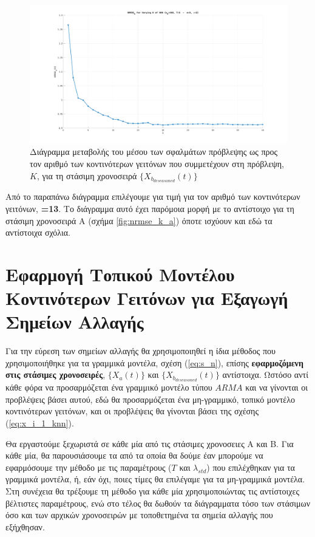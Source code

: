 \begin{figure}[H]
    \begin{center}
        \includegraphics[width=\textwidth]{assets/images/plots/nrmse_k_b.svg.pdf}
        \caption{Διάγραμμα μεταβολής του μέσου  των σφαλμάτων πρόβλεψης ως προς τον αριθμό των κοντινότερων γειτόνων που συμμετέχουν στη πρόβλεψη, $K$, για τη στάσιμη χρονοσειρά $\{X_{b_{deseasoned}}(t)\}$}
        \label{fig:nrmse_k_b}
    \end{center}
\end{figure}

Από το παραπάνω διάγραμμα επιλέγουμε για τιμή για τον αριθμό των κοντινότερων γειτόνων, \textbf{=13}. Το διάγραμμα αυτό έχει παρόμοια μορφή με το αντίστοιχο για τη στάσιμη χρονοσειρά Α (σχήμα \ref{fig:nrmse_k_a}) όποτε ισχύουν και εδώ τα αντίστοιχα σχόλια.


\section{Εφαρμογή Τοπικού Μοντέλου Κοντινότερων Γειτόνων για Εξαγωγή Σημείων Αλλαγής}

Για την εύρεση των σημείων αλλαγής θα χρησιμοποιηθεί η ίδια μέθοδος που χρησιμοποιήθηκε για τα γραμμικά μοντέλα, σχέση (\ref{eq:s_n}), επίσης \textbf{εφαρμοζόμενη στις στάσιμες χρονοσειρές}, $\{X_a(t)\}$ και $\{X_{b_{deseasoned}}(t)\}$ αντίστοιχα. Ωστόσο αντί κάθε φόρα να προσαρμόζεται ένα γραμμικό μοντέλο τύπου $ARMA$ και να γίνονται οι προβλέψεις βάσει αυτού, εδώ θα προσαρμόζεται ένα μη-γραμμικό, τοπικό μοντέλο κοντινότερων γειτόνων, και οι προβλέψεις θα γίνονται βάσει της σχέσης (\ref{eq:x_i_1_knn}).

Θα εργαστούμε ξεχωριστά σε κάθε μία από τις στάσιμες χρονοσειες Α και Β. Για κάθε μία, θα παρουσιάσουμε τα  από τα οποία θα δούμε έαν μπορούμε να εφαρμόσουμε την μέθοδο με τις παραμέτρους ($T$ και $\lambda_{std}$) που επιλέχθηκαν για τα γραμμικά μοντέλα, ή, εάν όχι, ποιες τίμες θα επιλέγαμε για τα μη-γραμμικά μοντέλα. Στη συνέχεια θα τρέξουμε τη μέθοδο για κάθε μία χρησιμοποιώντας τις αντίστοιχες βέλτιστες παραμέτρους, ενώ στο τέλος θα δωθούν τα διάγραμματα τόσο των στάσιμων όσο και των αρχικών χρονοσειρών με τοποθετημένα τα σημεία αλλαγής που εξήχθησαν.


